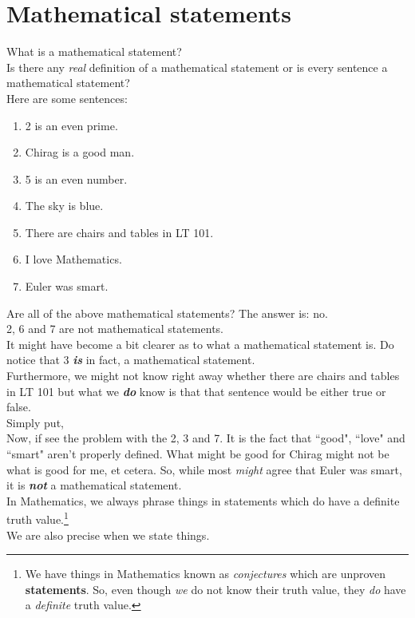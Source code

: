 \section{Mathematical statements}\label{sec:state}
What is a mathematical statement?\\
Is there any \textit{real} definition of a mathematical statement or is every sentence a mathematical statement?\\
Here are some sentences:
\begin{enumerate}
    \itemsep0em
    \item 2 is an even prime.
    \item Chirag is a good man.
    \item 5 is an even number.
    \item The sky is blue.
    \item There are chairs and tables in LT 101.
    \item I love Mathematics.
    \item Euler was smart.
\end{enumerate}
Are all of the above mathematical statements? The answer is: no.\\
2, 6 and 7 are not mathematical statements.\\
It might have become a bit clearer as to what a mathematical statement is. Do notice that 3 \textbf{\textit{is}} in fact, a mathematical statement.\\
Furthermore, we might not know right away whether there are chairs and tables in LT 101 but what we \textbf{\textit{do}} know is that that sentence would be either true or false.\\

Simply put, \\

Now, if see the problem with the 2, 3 and 7. It is the fact that ``good", ``love" and ``smart" aren't properly defined. What might be good for Chirag might not be what is good for me, et cetera. So, while most \textit{might} agree that Euler was smart, it is \textbf{\textit{not}} a mathematical statement.\\
In Mathematics, we always phrase things in statements which do have a definite truth value.\footnote{\label{ft:conjec} We have things in Mathematics known as \textit{conjectures} which are unproven \textbf{statements}. So, even though \textit{we} do not know their truth value, they \textit{do} have a \textit{definite} truth value.}\\
We are also precise when we state things.\\
\newpage
%
%
%
